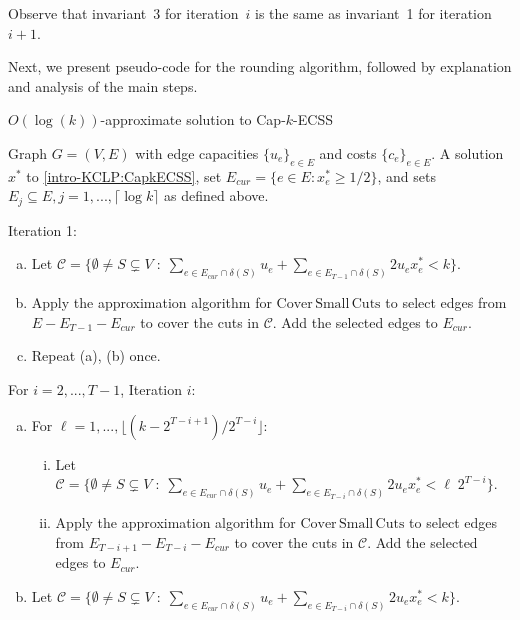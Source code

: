 \documentclass[11pt]{article}
\newcommand{\C}{\mathscr{C}}
\newcommand\ASC{\mathrm{Cover\,Small\,Cuts}}
\begin{document}
{Observe that invariant~3 for iteration~$i$ is the same as invariant~1 for iteration~$i+1$.

Next, we present pseudo-code for the rounding algorithm, followed by explanation and analysis of the main steps.

{
\begin{algorithm}[H]
    \caption{$O(\log(k))$-approximate solution to Cap-$k$-ECSS}\label{alg:capkECSS}
    \begin{algorithmic}[1]
        \Require Graph $G = (V,E)$ with edge capacities $\{u_e\}_{e \in E}$ and costs $\{c_e\}_{e\in E}$.  A solution $x^*$ to \eqref{intro-KCLP:CapkECSS}, set $E_{cur} = \{e\in E:x^*_e \geq 1/2\}$, and sets $E_j \subseteq E, j = 1,...,\lceil \log k \rceil$ as defined above.

        \State Iteration 1:
        \begin{enumerate}[(a)]
        \item Let $\C = \{\emptyset\neq S \subsetneq V \; : \; \sum_{e \in E_{cur} \cap \delta(S)}u_e + \sum_{e \in E_{T-1} \cap \delta(S)} 2 u_e x^*_e < k\}$.  
        
        \item  Apply the approximation algorithm for $\ASC$ to select edges from $E - E_{T-1} - E_{cur}$ to cover the cuts in $\C$.  Add the selected edges to $E_{cur}$.

        \item Repeat (a), (b) once.
    \end{enumerate}

    \State For $i = 2,...,T-1$, Iteration $i$:
    \begin{enumerate}[(a)]
        \item For $\ell = 1,...,\lfloor (k-2^{T-i+1})/2^{T-i} \rfloor$:
        \begin{enumerate}[(i)]
            \item Let $\C = \{\emptyset\neq S \subsetneq V \; : \; \sum_{e \in E_{cur} \cap \delta(S)}u_e + \sum_{e \in E_{T-i} \cap \delta(S)} 2 u_e x^*_e < \ell\; 2^{T-i}\}$.  

            \item Apply the approximation algorithm for $\ASC$ to select edges from $E _{T-i+1}- E_{T-i} - E_{cur}$ to cover the cuts in $\C$.  Add the selected edges to $E_{cur}$.
        \end{enumerate}

        \item Let $\C = \{\emptyset\neq S \subsetneq V \; : \; \sum_{e \in E_{cur} \cap \delta(S)}u_e + \sum_{e \in E_{T-i} \cap \delta(S)} 2 u_e x^*_e < k\}$.  
            

\end{enumerate}
\end{algorithmic}
\end{algorithm}}}
\end{document}
